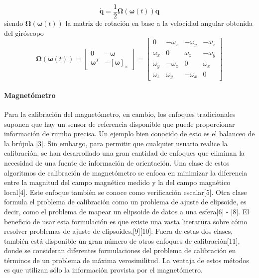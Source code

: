 \begin{equation}
    \dot{\bm{q}} = \frac{1}{2}\bm{\Omega}(\bm{\omega}(t))\bm{q}
    \label{eq:edoquaternion}
\end{equation}
siendo $\bm{\Omega}(\bm{\omega}(t))$ la matriz de rotación en base a la velocidad angular obtenida del giróscopo
\begin{equation}
    \bm{\Omega}(\bm{\omega}(t)) =
    \begin{bmatrix}
        0 & -\bm{\omega} \\
        \bm{\omega}^T & -\left[\bm{\omega}\right]_\times
    \end{bmatrix}
    =
    \begin{bmatrix}
        0 & -\omega_x & -\omega_y & -\omega_z \\
        \omega_x & 0 & \omega_z & -\omega_y \\
        \omega_y & -\omega_z & 0 & \omega_x \\
        \omega_z & \omega_y & -\omega_x & 0
    \end{bmatrix}
\end{equation}

\paragraph{Magnetómetro}
Para la calibración del magnetómetro, en cambio, los enfoques tradicionales suponen que hay un sensor de referencia disponible que puede proporcionar información de rumbo precisa. Un ejemplo bien conocido de esto es el balanceo de la brújula [3]. Sin embargo, para permitir que cualquier usuario realice la calibración, se han desarrollado una gran cantidad de enfoques que eliminan la necesidad de una fuente de información de orientación. Una clase de estos algoritmos de calibración de magnetómetro se enfoca en minimizar la diferencia entre la magnitud del campo magnético medido y la del campo magnético local[4]. Este enfoque también se conoce como verificación escalar[5]. Otra clase formula el problema de calibración como un problema de ajuste de elipsoide, es decir, como el problema de mapear un elipsoide de datos a una esfera[6] - [8]. El beneficio de usar esta formulación es que existe una vasta literatura sobre cómo resolver problemas de ajuste de elipsoides,[9][10]. Fuera de estas dos clases, también está disponible un gran número de otros enfoques de calibración[11], donde se consideran diferentes formulaciones del problema de calibración en términos de un problema de máxima verosimilitud. La ventaja de estos métodos es que utilizan sólo la información provista por el magnetómetro.

